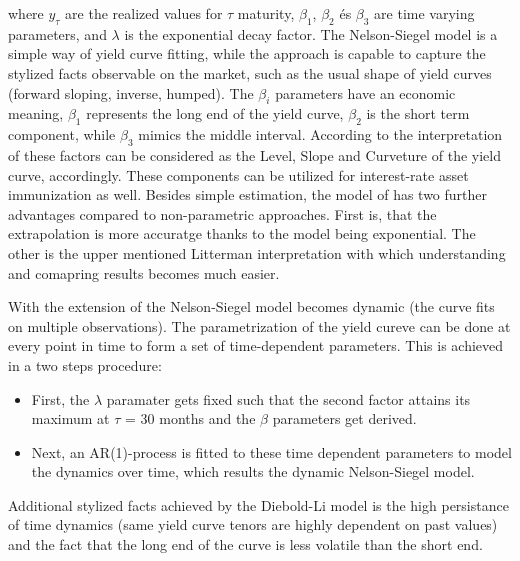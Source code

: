 \documentclass[12pt,bibliography=totoc]{article}
\begin{document}

where $y_{\tau}$ are the realized values for $\tau$ maturity, $\beta_{1}$, $\beta_{2}$ és $\beta_{3}$ are time varying parameters, and $\lambda$ is the exponential decay factor.
The Nelson-Siegel model is a simple way of yield curve fitting, while the approach is capable to capture the stylized facts observable on the market, such as the usual shape of yield curves (forward sloping, inverse, humped).
The $\beta_{i}$ parameters have an economic meaning, $\beta_{1}$ represents the long end of the yield curve,  $\beta_{2}$ is the short term component, while $\beta_{3}$ mimics the middle interval. According to the interpretation of \cite{litterman1991common} these factors can be considered as the Level, Slope and Curveture of the yield curve, accordingly. These components can be utilized for interest-rate asset immunization as well. Besides simple estimation, the model of \cite{diebold2006forecasting} has two further advantages compared to non-parametric approaches. First is, that the extrapolation is more accuratge thanks to the model being exponential. The other is the upper mentioned Litterman interpretation with which understanding and comapring results becomes much easier.
 
With the extension of \cite{diebold2006forecasting} the Nelson-Siegel model becomes dynamic (the curve fits on multiple observations). The parametrization of the yield cureve can be done at every point in time
to form a set of time-dependent parameters. This is achieved in a two steps procedure:
\begin{itemize}
\item First, the $\lambda$  paramater gets fixed such that the second factor attains its maximum at $\tau$ = 30 months and the $\beta$ parameters get derived.
\item Next, an AR(1)-process is fitted to these time dependent parameters to model the dynamics over time, which results the dynamic Nelson-Siegel model.
\end{itemize}

Additional stylized facts achieved by the Diebold-Li model is the high persistance of time dynamics (same yield curve tenors are highly dependent on past values) and the fact that the long end of the curve is less volatile than the short end.
\end{document}
